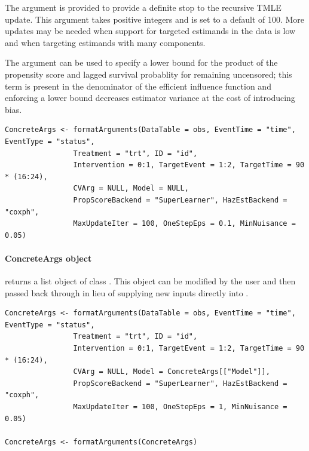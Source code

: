 \documentclass{report}
\newcommand{\1}{\ensuremath{\mathbf{1}}}
\begin{document}
The  argument is provided to provide a definite stop to the recursive TMLE update. This argument takes positive integers and is set to a default of 100. More updates may be needed when support for targeted estimands in the data is low and when targeting estimands with many components.

The argument  can be used to specify a lower bound for the product of the propensity score and lagged survival probablity for remaining uncensored; this term is present in the denominator of the efficient influence function and enforcing a lower bound decreases estimator variance at the cost of introducing bias. 

\begin{lstlisting}
ConcreteArgs <- formatArguments(DataTable = obs, EventTime = "time", EventType = "status", 
				Treatment = "trt", ID = "id", 
				Intervention = 0:1, TargetEvent = 1:2, TargetTime = 90 * (16:24), 
				CVArg = NULL, Model = NULL, 
				PropScoreBackend = "SuperLearner", HazEstBackend = "coxph", 
				MaxUpdateIter = 100, OneStepEps = 0.1, MinNuisance = 0.05)
\end{lstlisting}


\paragraph{ConcreteArgs object}
\label{concreteargs}
 returns a list object of class . This object can be modified by the user and then passed back through  in lieu of supplying new inputs directly into .

\begin{lstlisting}
ConcreteArgs <- formatArguments(DataTable = obs, EventTime = "time", EventType = "status", 
				Treatment = "trt", ID = "id", 
				Intervention = 0:1, TargetEvent = 1:2, TargetTime = 90 * (16:24), 
				CVArg = NULL, Model = ConcreteArgs[["Model"]], 
				PropScoreBackend = "SuperLearner", HazEstBackend = "coxph", 
				MaxUpdateIter = 100, OneStepEps = 1, MinNuisance = 0.05)

ConcreteArgs <- formatArguments(ConcreteArgs)
\end{lstlisting}
\end{document}
